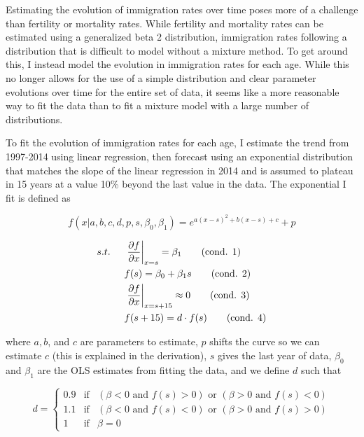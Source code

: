 \documentclass[10pt]{article}
\renewcommand{\thesection}{\arabic{section}}
\renewcommand{\thesubsection}{\thesection.\arabic{subsection}}
\renewcommand{\thesubsubsection}{\thesubsection.\arabic{subsubsection}}
\renewcommand{\subsubsection}[2][]{\oldsubsubsection[#1]{#2}\index{#1}\label{sec:\thesubsubsection}}
\numberwithin{equation}{subsection}
\begin{document}
\subsubsection{Immigration Rates}

\par Estimating the evolution of immigration rates over time poses more of a challenge than fertility or mortality rates. While fertility and mortality rates can be estimated using a generalized beta 2 distribution, immigration rates following a distribution that is difficult to model without a mixture method. To get around this, I instead model the evolution in immigration rates for each age. While this no longer allows for the use of a simple distribution and clear parameter evolutions over time for the entire set of data, it seems like a more reasonable way to fit the data than to fit a mixture model with a large number of distributions.

\par To fit the evolution of immigration rates for each age, I estimate the trend from 1997-2014 using linear regression, then forecast using an exponential distribution that matches the slope of the linear regression in 2014 and is assumed to plateau in 15 years at a value 10\% beyond the last value in the data. The exponential I fit is defined as

\begin{equation}
   f(x|a, b, c, d, p, s, \beta_0, \beta_1) = e^{a(x-s)^2 + b(x-s) + c} + p
\end{equation}

\begin{align*}
   s.t. \hspace{5mm} &\left.\pdv{f}{x}\right|_{x=s} = \beta_1 \tag{cond. 1} \label{c1} \\
   &f(s) = \beta_0 + \beta_1 s \tag{cond. 2} \label{c2} \\
   &\left.\pdv{f}{x}\right|_{x=s + 15} \approx 0 \tag{cond. 3} \label{c3} \\
   &f(s + 15) = d \cdot f(s) \tag{cond. 4} \label{c4}
\end{align*}

\par where \(a, b\), and \(c\) are parameters to estimate, \(p\) shifts the curve so we can estimate \(c\) (this is explained in the derivation), \(s\) gives the last year of data, \(\beta_0\) and \(\beta_1\) are the OLS estimates from fitting the data, and we define \(d\) such that

\[
   d = \left\{\begin{matrix}
      0.9 & \text{if} & (\beta < 0 \text{ and } f(s) > 0) \text{ or } (\beta > 0 \text{ and } f(s) < 0) \\
      1.1 & \text{if} & (\beta < 0 \text{ and } f(s) < 0) \text{ or } (\beta > 0 \text{ and } f(s) > 0) \\
      1 & \text{if} & \beta = 0
   \end{matrix}\right.
\]
\end{document}
